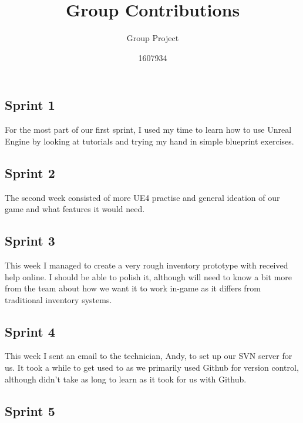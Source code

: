 \documentclass{scrartcl}
\title{Group Contributions}
\subtitle{Group Project}
\author{1607934}
\begin{document}
\maketitle


\newpage
\clearpage

\section*{}


\subsection*{Sprint 1}

For the most part of our first sprint, I used my time to learn how to use Unreal Engine by looking at tutorials and trying my hand in simple blueprint exercises. 

\subsection*{Sprint 2}

The second week consisted of more UE4 practise and general ideation of our game and what features it would need.

\subsection*{Sprint 3}

This week I managed to create a very rough inventory prototype with received help online. I should be able to polish it, although will need to know a bit more from the team about how we want it to work in-game as it differs from traditional inventory systems.

\subsection*{Sprint 4}

This week I sent an email to the technician, Andy, to set up our SVN server for us. It took a while to get used to as we primarily used Github for version control, although didn't take as long to learn as it took for us with Github.

\subsection*{Sprint 5}
\end{document}

